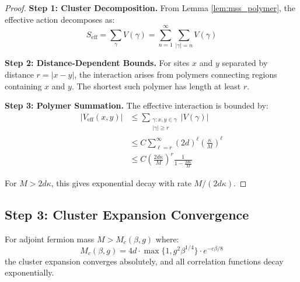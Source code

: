 \begin{proof}
\textbf{Step 1: Cluster Decomposition.}
From Lemma \ref{lem:mss_polymer}, the effective action decomposes as:
\begin{equation}
S_{\text{eff}} = \sum_{\gamma} V(\gamma) = \sum_{n=1}^{\infty} \sum_{|\gamma|=n} V(\gamma)
\end{equation}

\textbf{Step 2: Distance-Dependent Bounds.}
For sites $x$ and $y$ separated by distance $r = |x-y|$, the interaction arises 
from polymers connecting regions containing $x$ and $y$. The shortest such 
polymer has length at least $r$.

\textbf{Step 3: Polymer Summation.}
The effective interaction is bounded by:
\begin{align}
|V_{\text{eff}}(x,y)| &\leq \sum_{\substack{\gamma: x,y \in \gamma \\ |\gamma| \geq r}} |V(\gamma)| \\
&\leq C \sum_{\ell=r}^{\infty} (2d)^\ell \left(\frac{\kappa}{M}\right)^\ell \\
&\leq C \left(\frac{2d\kappa}{M}\right)^r \frac{1}{1 - \frac{2d\kappa}{M}}
\end{align}

For $M > 2d\kappa$, this gives exponential decay with rate $M/(2d\kappa)$.
\end{proof}

\subsection{Step 3: Cluster Expansion Convergence}

\begin{theorem}
\label{thm:cluster_convergence}
For adjoint fermion mass $M > M_c(\beta, g)$ where:
\begin{equation}
M_c(\beta, g) = 4d \cdot \max\{1, g^2\beta^{1/4}\} \cdot e^{-c\beta/8}
\end{equation}
the cluster expansion converges absolutely, and all correlation functions decay exponentially.
\end{theorem}

